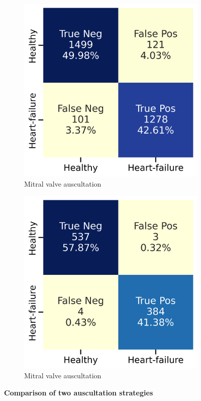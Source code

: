 \begin{figure}[htbp]
    \centering
    \begin{subfigure}[b]{0.45\textwidth}
        \centering
        \includegraphics[width=\textwidth]{./figs/results/Confusion Matrix 1.png}
        \caption{Mitral valve auscultation}
        \label{fig:mitral_valve_1}
    \end{subfigure}
    \hfill
    \begin{subfigure}[b]{0.45\textwidth}
        \centering
        \includegraphics[width=\textwidth]{./figs/results/Confusion Matrix 2.png}
        \caption{Mitral valve auscultation}
        \label{fig:mitral_valve_2}
    \end{subfigure}
    \caption{\textbf{Comparison of two auscultation strategies}}
    \label{fig:comparison}
\end{figure}



